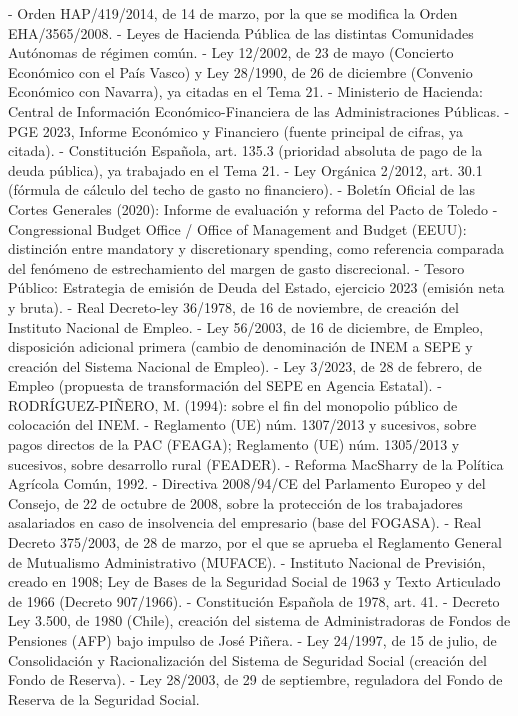 \documentclass[10pt,a4paper]{article}
\begin{document}
- Orden HAP/419/2014, de 14 de marzo, por la que se modifica la Orden EHA/3565/2008.
- Leyes de Hacienda Pública de las distintas Comunidades Autónomas de régimen común.
- Ley 12/2002, de 23 de mayo (Concierto Económico con el País Vasco) y Ley 28/1990, de 26 de diciembre (Convenio Económico con Navarra), ya citadas en el Tema 21.
- Ministerio de Hacienda: Central de Información Económico-Financiera de las Administraciones Públicas.
- PGE 2023, Informe Económico y Financiero (fuente principal de cifras, ya citada).
- Constitución Española, art. 135.3 (prioridad absoluta de pago de la deuda pública), ya trabajado en el Tema 21.
- Ley Orgánica 2/2012, art. 30.1 (fórmula de cálculo del techo de gasto no financiero).
- Boletín Oficial de las Cortes Generales (2020): Informe de evaluación y reforma del Pacto de Toledo
- Congressional Budget Office / Office of Management and Budget (EEUU): distinción entre mandatory y discretionary spending, como referencia comparada del fenómeno de estrechamiento del margen de gasto discrecional.
- Tesoro Público: Estrategia de emisión de Deuda del Estado, ejercicio 2023 (emisión neta y bruta).
- Real Decreto-ley 36/1978, de 16 de noviembre, de creación del Instituto Nacional de Empleo.
- Ley 56/2003, de 16 de diciembre, de Empleo, disposición adicional primera (cambio de denominación de INEM a SEPE y creación del Sistema Nacional de Empleo).
- Ley 3/2023, de 28 de febrero, de Empleo (propuesta de transformación del SEPE en Agencia Estatal).
- RODRÍGUEZ-PIÑERO, M. (1994): sobre el fin del monopolio público de colocación del INEM.
- Reglamento (UE) núm. 1307/2013 y sucesivos, sobre pagos directos de la PAC (FEAGA); Reglamento (UE) núm. 1305/2013 y sucesivos, sobre desarrollo rural (FEADER).
- Reforma MacSharry de la Política Agrícola Común, 1992.
- Directiva 2008/94/CE del Parlamento Europeo y del Consejo, de 22 de octubre de 2008, sobre la protección de los trabajadores asalariados en caso de insolvencia del empresario (base del FOGASA).
- Real Decreto 375/2003, de 28 de marzo, por el que se aprueba el Reglamento General de Mutualismo Administrativo (MUFACE).
- Instituto Nacional de Previsión, creado en 1908; Ley de Bases de la Seguridad Social de 1963 y Texto Articulado de 1966 (Decreto 907/1966).
- Constitución Española de 1978, art. 41.
- Decreto Ley 3.500, de 1980 (Chile), creación del sistema de Administradoras de Fondos de Pensiones (AFP) bajo impulso de José Piñera.
- Ley 24/1997, de 15 de julio, de Consolidación y Racionalización del Sistema de Seguridad Social (creación del Fondo de Reserva).
- Ley 28/2003, de 29 de septiembre, reguladora del Fondo de Reserva de la Seguridad Social.
\end{document}
